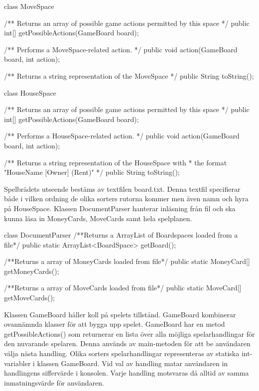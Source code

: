 \begin{JavaSpec}{class MoveSpace}
 
    /** Returns an array of possible game actions permitted by this space */
    public int[] getPossibleActions(GameBoard board);

    /** Performs a MoveSpace-related action. */
    public void action(GameBoard board, int action);

    /** Returns a string representation of the MoveSpace */
   public String toString();

\end{JavaSpec}

\begin{JavaSpec}{class HouseSpace}
 
    /** Returns an array of possible game actions permitted by this space */
    public int[] getPossibleActions(GameBoard board);

    /** Performs a HouseSpace-related action. */
    public void action(GameBoard board, int action);

    /** Returns a string representation of the HouseSpace with
      * the format "HouseName [Owner] (Rent)" */
   public String toString();

\end{JavaSpec}

Spelbrädets utseende bestäms av textfilen board.txt. Denna textfil specifierar både i vilken ordning de olika sorters rutorna kommer men även namn och hyra på HouseSpace. Klassen DocumentParser hanterar inläsning från fil och ska kunna läsa in MoneyCards, MoveCards samt hela spelplanen. 

\begin{JavaSpec}{class DocumentParser}
	/**Returns a ArrayList of Boardspaces loaded from a file*/
	public static ArrayList<BoardSpace> getBoard();

	/**Returns a array of MoneyCards loaded from file*/
	public static MoneyCard[] getMoneyCards();

	/**Returns a array of MoveCards loaded from file*/
	public static MoveCard[] getMoveCards();
\end{JavaSpec}


Klassen GameBoard håller koll på spelets tillstånd.
GameBoard kombinerar ovannämnda klasser för att bygga upp spelet. GameBoard har en metod getPossibleActions() som returnerar en lista över alla möjliga spelarhandlingar för den nuvarande spelaren. Denna används av main-metoden för att be användaren välja nästa handling. 
Olika sorters spelarhandlingar representeras av statiska int-variabler i klassen GameBoard. Vid val av handling matar användaren in handlingens siffervärde i konsolen. Varje handling motsvaras då alltid av samma inmatningsvärde för användaren.


